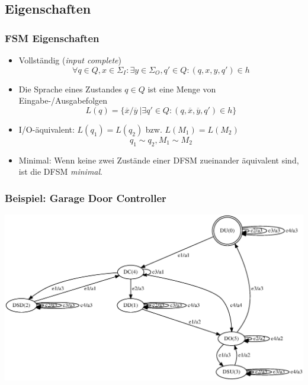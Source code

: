 \documentclass[10pt]{beamer}
\begin{document}
\subsection{Eigenschaften}
\begin{frame}
\frametitle{FSM Eigenschaften}
\begin{itemize}
  \item<1-> Vollständig (\emph{input complete})$$\forall q\in Q, x\in \Sigma_I : \exists y \in \Sigma_O, q'\in Q : (q,x,y,q')\in h$$
  \item<2-> Die Sprache eines Zustandes $q \in Q$ ist eine Menge von Eingabe-/Aus\-gabefolgen $$L(q)= \{\overline{x}/\overline{y}\ | \exists q' \in Q : (q,\overline{x}, \overline{y}, q') \in h \}$$
  \item<3-> I/O-äquivalent: $L(q_1) = L(q_2)$ bzw. $L(M_1) = L(M_2)$ $$q_1 \sim q_2, M_1 \sim M_2$$
  \item<4-> Minimal: Wenn keine zwei Zustände einer DFSM zueinander äquivalent sind, ist die DFSM \emph{minimal}.
\end{itemize}
\end{frame}

\begin{frame}
\frametitle{Beispiel: Garage Door Controller}

\includegraphics[width=\textwidth]{images/gdc}

\end{frame}
\end{document}
